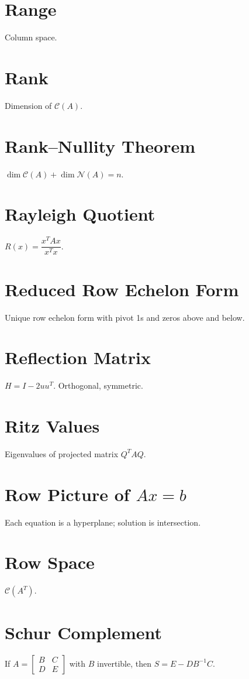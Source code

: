 \documentclass[12pt]{book}
\begin{document}
\chapter{Range}
Column space.

\chapter{Rank}
Dimension of $\mathcal{C}(A)$.

\chapter{Rank--Nullity Theorem}
$\dim\mathcal{C}(A) + \dim\mathcal{N}(A) = n$.

\chapter{Rayleigh Quotient}
$R(x) = \dfrac{x^T A x}{x^T x}$.

\chapter{Reduced Row Echelon Form}
Unique row echelon form with pivot 1s and zeros above and below.

\chapter{Reflection Matrix}
$H=I-2uu^T$. Orthogonal, symmetric.

\chapter{Ritz Values}
Eigenvalues of projected matrix $Q^T A Q$.

\chapter{Row Picture of $Ax=b$}
Each equation is a hyperplane; solution is intersection.

\chapter{Row Space}
$\mathcal{C}(A^T)$.

\chapter{Schur Complement}
If $A=\begin{bmatrix} B & C \\ D & E\end{bmatrix}$ with $B$ invertible, then $S=E-DB^{-1}C$.
\end{document}
